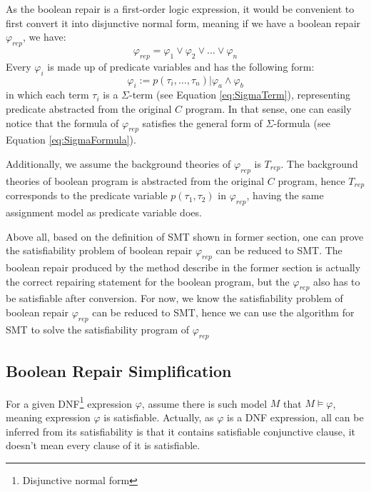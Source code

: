 \documentclass[10pt,journal,final,]{article}
\theoremstyle{definition}
\begin{document}
As the boolean repair is a first-order logic expression, it would be convenient to first convert it into disjunctive normal form, meaning if we have a boolean repair $\varphi _{rep}$, we have:
\begin{equation}
\varphi _{rep} = \varphi _{1} \vee \varphi _{2} \vee \dots \vee \varphi _{n}
\end{equation}
Every $\varphi _{i}$ is made up of predicate variables and has the following form:
\begin{equation}
\varphi _{i} := p(\tau _{i},\dots,\tau _{n}) | \varphi _{a} \wedge \varphi _{b}
\end{equation}
in which each term $\tau _{i}$ is a $\Sigma$-term (see Equation \ref{eq:SigmaTerm}), representing predicate abstracted from the original $C$ program.
In that sense, one can easily notice that the formula of $\varphi _{rep}$ satisfies the general form of $\Sigma$-formula (see Equation \ref{eq:SigmaFormula}).

Additionally, we assume the background theories of $\varphi _{rep}$ is $T_{rep}$.
The background theories of boolean program is abstracted from the original $C$ program, hence $T_{rep}$ corresponds to the predicate variable $p(\tau _{1}, \tau _{2})$ in $\varphi _{rep}$, having the same assignment model as predicate variable does.

Above all, based on the definition of SMT shown in former section, one can prove the satisfiability problem of boolean repair $\varphi _{rep}$ can be reduced to SMT.
The boolean repair produced by the method describe in the former section is actually the correct repairing statement for the boolean program, but the $\varphi _{rep}$ also has to be satisfiable after conversion.
For now, we know the satisfiability problem of boolean repair $\varphi _{rep}$ can be reduced to SMT, hence we can use the algorithm for SMT to solve the satisfiability program of $\varphi _{rep}$

\subsection{Boolean Repair Simplification}
\label{section:BooleanRepairSimplification}
For a given DNF\footnote{Disjunctive normal form} expression $\varphi$, assume there is such model $M$ that $M \models \varphi$, meaning expression $\varphi$ is satisfiable.
Actually, as $\varphi$ is a DNF expression, all can be inferred from its satisfiability is that it contains satisfiable conjunctive clause, it doesn't mean every clause of it is satisfiable.
\end{document}
